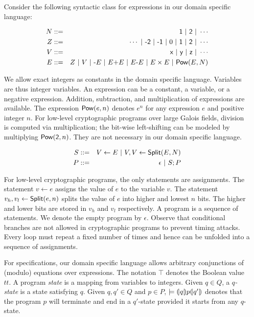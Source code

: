 
Consider the following syntactic class for expressions in our domain
specific language:

\begin{eqnarray*}
  N & ::= & \dslcode{1}\ |\ \dslcode{2}\ |\ \cdots\\
  Z & ::= & \cdots \ |\ \dslcode{-2}\ |\ \dslcode{-1} \ |\ 0\ |\ 
            \dslcode{1}\ |\ \dslcode{2}\ |\ \cdots\\
  V & ::= & \dslcode{x} \ |\ \dslcode{y} \ |\ \dslcode{z} \ |\ \cdots\\
  E & ::= &  Z \ |\ V \ |\  \dslcode{-}E \ |\ E \dslcode{+} E 
             \ |\ E \dslcode{-} E
             \ |\ E \times E \ |\ \dslcode{Pow} (E, N)
\end{eqnarray*}

We allow exact integers as constants in the domain specific
language. Variables are thus integer variables. An expression can be a
constant, a variable, or a negative expression. Addition, subtraction,
and multiplication of expressions are available. The expression
$\mbox{\textsf{Pow}}(e, n)$ denotes $e^n$ for any expression $e$ and positive
integer $n$. For low-level cryptographic programs over large Galois
fields, division is computed via multiplication; the bit-wise
left-shifting can be modeled by multiplying
$\mbox{\textsf{Pow}}(\mbox{\textsf{2}}, n)$. They are not necessary in our
domain specific language. 

\begin{eqnarray*}
  S & ::= & V \leftarrow E 
            \ |\  V, V \leftarrow \mbox{\textsf{Split}} (E, N)\\
  P & ::= & \epsilon \ |\ S; P
\end{eqnarray*}

For low-level cryptographic programs, the only statements are
assignments. The statement $v \leftarrow e$ assigns the value of $e$
to the variable $v$. The statement $v_h, v_l \leftarrow
\mbox{\textsf{Split}}(e, n)$ splits the value of $e$ into higher and lowest
$n$ bits. The higher and lower bits are stored in $v_h$ and $v_l$
respectively. A program is a sequence of statements. We denote the
empty program by $\epsilon$. Observe that conditional branches are not
allowed in cryptographic programs to prevent timing attacks. Every
loop must repeat a fixed number of times and hence can be unfolded
into a sequence of assignments.

For specifications, our domain specific language allows arbitrary
conjunctions of (modulo) equations over expressions. The notation
$\top$ denotes the Boolean value $\mathit{tt}$. A program
\textit{state} is a mapping from variables to integers. Given $q \in
Q$, a \emph{$q$-state} is a state satisfying $q$.
Given $q, q' \in Q$ and $p \in P$, $\models {(\!|}{q}{|\!)} p {(\!|}{q'}{|\!)}$
denotes that the program $p$ will terminate and end in a $q'$-state
provided it starts from any $q$-state.

